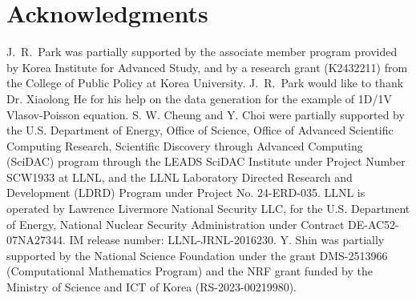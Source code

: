 \documentclass[final]{siamltex}
\begin{document}
\section*{Acknowledgments}
J.\ R.\ Park was partially supported by the associate member program provided by Korea Institute for Advanced Study, and by a research grant (K2432211) from the College of Public Policy at Korea University. 
J.\ R.\ Park would like to thank Dr. Xiaolong He for his help on the data generation for the example of 1D/1V Vlasov-Poisson equation.
S. W. Cheung and Y. Choi were partially supported by 
the U.S. Department of Energy, Office of Science, 
Office of Advanced Scientific Computing Research,
Scientific Discovery through Advanced Computing (SciDAC) program through
the LEADS SciDAC Institute under Project Number SCW1933 at LLNL,
and the LLNL Laboratory Directed Research and Development (LDRD) Program 
under Project No. 24-ERD-035.
LLNL is operated by Lawrence Livermore National Security LLC, for the
U.S. Department of Energy, National Nuclear Security Administration
under Contract DE-AC52-07NA27344.
IM release number: LLNL-JRNL-2016230.
Y. Shin was partially supported by the National Science Foundation under the grant DMS-2513966 (Computational Mathematics Program) and the NRF grant funded by the Ministry of Science and ICT of Korea (RS-2023-00219980).
\end{document}
